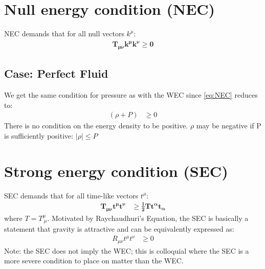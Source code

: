 \documentclass[10pt]{article}
\begin{document}
            \section{Null energy condition (NEC)}\label{sec:NEC}
                NEC demands that for all null vectors $k^\mu$:
                \begin{align}\label{eq:NEC}
                    \boldsymbol{T_{\mu\nu}k^{\mu}k^{\nu} \geq 0}
                \end{align} 
            \subsection{Case: Perfect Fluid}
                We get the same condition for pressure as with the WEC since \eqref{eq:NEC} reduces to:
                \begin{align}
                    (\rho+P) &\geq 0
                \end{align}
                There is no condition on the energy density to be positive. $\rho$ may be negative if P is sufficiently positive: $|\rho| \leq P$ 
                
        	\section{Strong energy condition (SEC)}\label{sec:SEC}
        	    SEC demands that for all time-like vectors $t^\mu$:
                \begin{align}\label{eq:SEC}
                    \boldsymbol{T_{\mu\nu}t^{\mu}t^{\nu} } &\boldsymbol{\geq \frac{1}{2}Tt^{\alpha}t_{\alpha}} 
                \end{align} 
                where $T = T^{\mu}_{\ \mu}$. 
                Motivated by Raychaudhuri's Equation, the SEC is basically a statement that gravity is attractive and can be equivalently expressed as: 
                \begin{align}
                    R_{\mu\nu}t^{\mu}t^{\nu} &\geq 0 
                \end{align}
                Note: the SEC does not imply the WEC; this is colloquial where the SEC is a more severe condition to place on matter than the WEC. 
\end{document}
